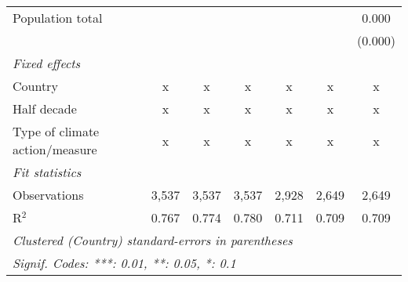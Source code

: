 \begin{tabular}{lcccccc}
   Population total                                              &         &               &                &                &                & 0.000\\   
                                                                 &         &               &                &                &                & (0.000)\\   
   \emph{Fixed effects}\\
   Country                                                       & x       & x             & x              & x              & x              & x\\  
   Half decade                                                   & x       & x             & x              & x              & x              & x\\  
   Type of climate action/measure                                & x       & x             & x              & x              & x              & x\\  
   \midrule \emph{Fit statistics}\\
   Observations                                                  & 3,537   & 3,537         & 3,537          & 2,928          & 2,649          & 2,649\\  
   R$^2$                                                         & 0.767   & 0.774         & 0.780          & 0.711          & 0.709          & 0.709\\  
   \midrule
   \multicolumn{7}{l}{\emph{Clustered (Country) standard-errors in parentheses}}\\
   \multicolumn{7}{l}{\emph{Signif. Codes: ***: 0.01, **: 0.05, *: 0.1}}\\
\end{tabular}
\par\endgroup


